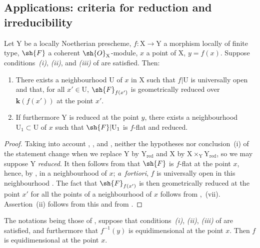 \subsection{Applications: criteria for reduction and irreducibility}
\label{subsection:IV.15.3}

\begin{proposition}[15.3.1]
\label{IV.15.3.1}
Let $\mathrm{Y}$ be a locally Noetherian prescheme, $f:\mathrm{X}\to\mathrm{Y}$ a morphism locally of finite type, $\sh{F}$ a coherent $\sh{O}_\mathrm{X}$-module, $x$ a point of $\mathrm{X}$, $y=f(x)$.
Suppose conditions~\emph{(i)}, \emph{(ii)}, and \emph{(iii)} of  are satisfied.
Then:
\begin{enumerate}[label=(\roman*)]
  \item There exists a neighbourhood $\mathrm{U}$ of $x$ in $\mathrm{X}$ such that $f|\mathrm{U}$ is universally open and that, for all $x'\in\mathrm{U}$, $\sh{F}_{f(x')}$ is geometrically reduced over $\mathbf{k}(f(x'))$ at the point $x'$.
  \item If furthermore $\mathrm{Y}$ is reduced at the point $y$, there exists a neighbourhood $\mathrm{U}_1\subset\mathrm{U}$ of $x$ such that $\sh{F}|\mathrm{U}_1$ is $f$-flat and reduced.
\end{enumerate}
\end{proposition}

\begin{proof}
\label{IV.15.3.1-proof}
Taking into account , , and , neither the hypotheses nor conclusion~(i) of the statement change when we replace $\mathrm{Y}$ by $\mathrm{Y}_\mathrm{red}$ and $\mathrm{X}$ by $\mathrm{X}\times_\mathrm{Y}\mathrm{Y}_\mathrm{red}$, so we may suppose $\mathrm{Y}$ \emph{reduced}.
It then follows from  that $\sh{F}$ is $f$-flat at the point $x$, hence, by , in a neighbourhood of $x$; \emph{a~fortiori}, $f$ is universally open in this neighbourhood .
The fact that $\sh{F}_{f(x')}$ is then geometrically reduced at the point $x'$
for all the points of a neighbourhood of $x$ follows from ,~(vii).
Assertion~(ii) follows from this and from .
\end{proof}

\begin{proposition}[15.3.2]
\label{IV.15.3.2}
The notations being those of , suppose that conditions~\emph{(i)}, \emph{(ii)}, \emph{(iii)} of  are satisfied, and furthermore that $f^{-1}(y)$ is equidimensional at the point $x$.
Then $f$ is equidimensional at the point $x$.
\end{proposition}


